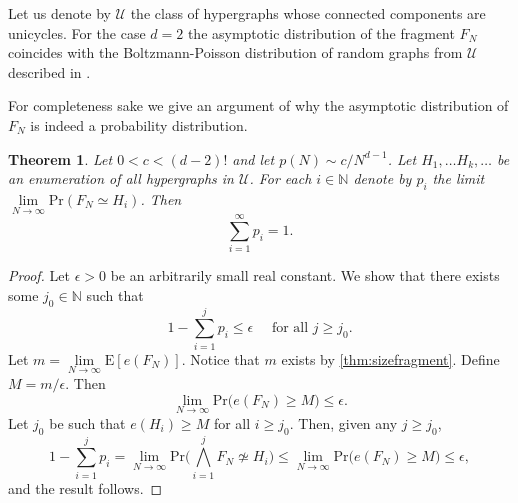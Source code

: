 \documentclass[11pt,notitlepage,a4paper]{article}
\newtheorem{theorem}{Theorem}[section]
\theoremstyle{definition}
\newcommand{\N}{\mathbb{N}}
\newcommand{\LN}{\lim\limits_{N\to \infty}}
\begin{document}
Let us denote by $\mathcal{U}$ the class of hypergraphs
whose connected components are unicycles. For the case $d=2$ 
the asymptotic distribution of the fragment $F_N$ coincides with
the Boltzmann-Poisson distribution of random graphs from $\mathcal{U}$
described in \cite{mcdiarmid2009random}.
\par
For completeness sake we give an argument of why the asymptotic distribution
of $F_N$ is indeed a probability distribution.  



\begin{theorem}
	Let $0<c<(d-2)!$ and let $p(N)\sim c/N^{d-1}$. 
	Let $H_1, \dots H_k, \dots$ be an enumeration of all hypergraphs
	in $\mathcal{U}$. For each $i\in \N$ 
	denote by $p_i$ the limit $\LN \mathrm{Pr}(F_N \simeq H_i)$. Then
	\[
	\sum_{i=1}^\infty p_i = 1.	
	\]
\end{theorem}
\begin{proof}
	Let $\epsilon>0$ be an arbitrarily small real constant. We show that 
	there exists some $j_0\in \N$ such that
	\[
	1- \sum_{i=1}^j p_i \leq \epsilon \quad \text{ for all } j\geq j_0.	
	\]	
	Let $m=\LN \mathrm{E}[e(F_N)]$. Notice that $m$ exists by \cref{thm:sizefragment}.
	Define $M=m/\epsilon$. Then 
	\[
	\LN \mathrm{Pr}\big(e(F_N)\geq M\big)\leq \epsilon.
	\]
	Let $j_0$ be such that $e(H_i)\geq M$ for all $i\geq j_0$. 
	Then, given any $j\geq j_0$, 
	\[
	1 - \sum_{i=1}^j p_i = \LN \mathrm{Pr}\big(
	\bigwedge_{i=1}^j F_N \not\simeq H_i\big) \leq
	\LN \mathrm{Pr}\big(
	e(F_N) \geq M \big)\leq \epsilon, 	
	\]	
	and the result follows. 
\end{proof}
\end{document}
